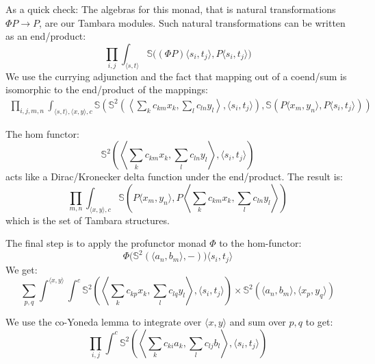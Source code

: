 \documentclass[11pt]{amsart}
\begin{document}
As a quick check: The algebras for this monad, that is natural transformations $\Phi P \to P$, are our Tambara modules. Such natural transformations can be written as an end/product:
\[ \prod_{i, j} \int_{\langle s, t\rangle} \mathbb{S} \big((\Phi P) \langle s_i, t_j \rangle, P \langle s_i, t_j \rangle \big) \]
We use the currying adjunction and the fact that mapping out of a coend/sum is isomorphic to the end/product of the mappings:
 \begin{align*}
\prod_{i, j, m, n} \int_{\langle s, t\rangle, \langle x, y \rangle, c}  \mathbb{S} \left(
    \mathbb{S}^2
      \left(\left \langle \sum_k c_{k m}  x_k
    , \sum_l c_{l n} y_l \right \rangle,  
        \langle s_i, t_j \rangle \right),
     \mathbb{S}(  P\langle x_m, y_n \rangle, P \langle s_i, t_j \rangle ) \right)
\end{align*}

The hom functor:
\[ \mathbb{S}^2  \left(\left \langle 
      \sum_k c_{k m}  x_k
    , \sum_l c_{l n} y_l \right \rangle,  
        \langle s_i, t_j \rangle \right) \]
acts like a Dirac/Kronecker delta function under the end/product. The result is:
\[ \prod_{m, n} \int_{\langle x, y \rangle , c} \mathbb{S} \left(P\langle x_m, y_n \rangle, P \left \langle \sum_k c_{k m}  x_k  , \sum_l c_{l n} y_l \right \rangle \right) \]
which is the set of Tambara structures.

The final step is to apply the profunctor monad $\Phi$ to the hom-functor:
\[ \Phi \big( \mathbb{S}^2(\langle a_n, b_m \rangle, -) \big)  \langle s_i, t_j \rangle \]
We get:
\[ \sum_{p, q} \int^{\langle x, y \rangle} \int^{c}  
    \mathbb{S}^2
      \left(\left \langle \sum_k c_{k p}  x_k
    , \sum_l c_{l q} y_l \right \rangle,  
        \langle s_i, t_j \rangle \right)
     \times  \mathbb{S}^2( \langle a_n, b_m \rangle, \langle x_p, y_q \rangle)\]

We use the co-Yoneda lemma to integrate over $\langle x, y \rangle$ and sum over $p, q$ to get:
\[ \prod_{i, j} \int^c \mathbb{S}^2  \left(\left \langle 
      \sum_k c_{k i}  a_k
    , \sum_l c_{l j} b_l \right \rangle,  
        \langle s_i, t_j \rangle \right) \]
\end{document}
